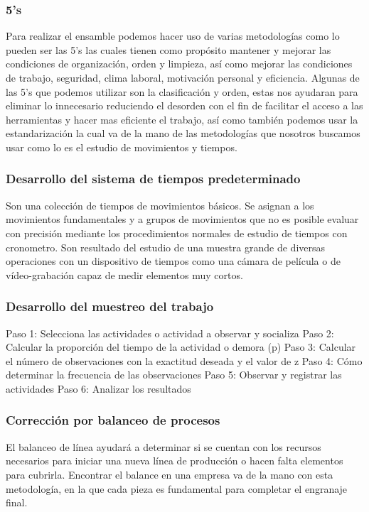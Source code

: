     \subsubsection{5's}
     Para realizar el ensamble podemos hacer uso de varias metodologías como lo pueden ser las 5's las cuales tienen como propósito mantener y mejorar las condiciones de organización, orden y limpieza, así como mejorar las condiciones de trabajo, seguridad, clima laboral, motivación personal y eficiencia.
    Algunas de las 5's que podemos utilizar son la clasificación y orden, estas nos ayudaran para eliminar lo innecesario reduciendo el desorden con el fin de facilitar el acceso a las herramientas y hacer mas eficiente el trabajo, así como también podemos usar la estandarización la cual va de la mano de las metodologías que nosotros buscamos usar como lo es el estudio de movimientos y tiempos.
    \subsubsection{Desarrollo del sistema de tiempos predeterminado}
    Son una colección de tiempos de movimientos básicos. Se asignan a los movimientos fundamentales y a grupos de movimientos que no es posible evaluar con precisión mediante los procedimientos normales de estudio de tiempos con cronometro. Son resultado del estudio de una muestra grande de diversas operaciones con un dispositivo de tiempos como una cámara de película o de vídeo-grabación capaz de medir elementos muy cortos.
    \cite{Sistemadetiempospredeterminados}
    \subsubsection{Desarrollo del muestreo del trabajo}
    Paso 1: Selecciona las actividades o actividad a observar y socializa
    Paso 2: Calcular la proporción del tiempo de la actividad o demora (p)
    Paso 3: Calcular el número de observaciones con la exactitud deseada y el valor de z
    Paso 4: Cómo determinar la frecuencia de las observaciones
    Paso 5: Observar y registrar las actividades
    Paso 6: Analizar los resultados
    \cite{muestreodeltrabajo}
    \subsubsection{Corrección por balanceo de procesos}
    El balanceo de línea ayudará a determinar si se cuentan con los recursos necesarios para iniciar una nueva línea de producción o hacen falta elementos para cubrirla. Encontrar el balance en una empresa va de la mano con esta metodología, en la que cada pieza es fundamental para completar el engranaje final.
    \cite{Balanceodelineas}
